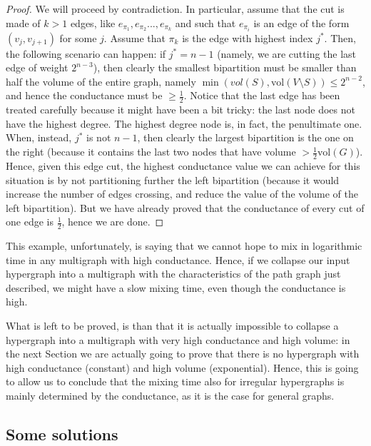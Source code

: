 \documentclass[../main.tex]{subfiles}
\begin{document}
\begin{proof}
    We will proceed by contradiction. In particular, assume that the cut is made of $k>1$ edges, like $e_{\pi_1}, e_{\pi_{2}}..., e_{\pi_{k}}$ and such that $e_{\pi_i}$ is an edge of the form $(v_j, v_{j+1})$ for some $j$. Assume that $\pi_{k}$ is the edge with highest index $j^*$. Then, the following scenario can happen: if $j^* = n-1$ (namely, we are cutting the last edge of weight $2^{n-3}$), then clearly the smallest bipartition must be smaller than half the volume of the entire graph, namely $\min(vol(S), \text{vol}(V\setminus S)) \leq 2^{n-2}$, and hence the conductance must be $\geq \frac{1}{2}$. Notice that the last edge  has been treated carefully because it might have been a bit tricky: the last node does not have the highest degree. The highest degree node is, in fact, the penultimate one. When, instead, $j^*$ is not $n-1$, then clearly the largest bipartition is the one on the right (because it contains the last two nodes that have volume $> \frac{1}{2} \text{vol}(G)$). Hence, given this edge cut, the highest conductance value we can achieve for this situation is by not partitioning further the left bipartition (because it would increase the number of edges crossing, and reduce the value of the volume of the left bipartition). But we have already proved that the conductance of every cut of one edge is $\frac{1}{2}$, hence we are done.
\end{proof}

This example, unfortunately, is saying that we cannot hope to mix in logarithmic time in any multigraph with high conductance. Hence, if we collapse our input hypergraph into a multigraph with the characteristics of the path graph just described, we might have a slow mixing time, even though the conductance is high.

What is left to be proved, is than that it is actually impossible to collapse a hypergraph into a multigraph with very high conductance and high volume: in the next Section we are actually going to prove that there is no hypergraph with high conductance (constant) and high volume (exponential). Hence, this is going to allow us to conclude that the mixing time also for irregular hypergraphs is mainly determined by the conductance, as it is the case for general graphs.

\subsection{Some solutions}
\label{subsec:some_solutions}
\end{document}
